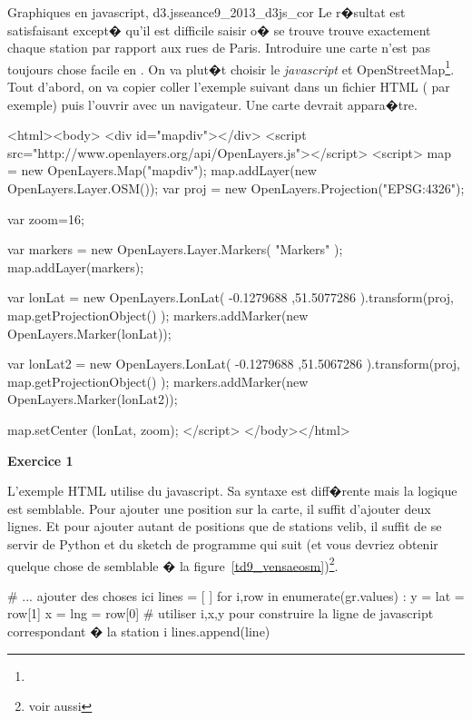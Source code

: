 \begin{xtd}{Graphiques en javascript, d3.js}{seance9_2013_d3js_cor}
Le r�sultat est satisfaisant except� qu'il est difficile saisir o� se trouve trouve exactement chaque station par rapport aux rues de Paris. Introduire une carte n'est pas toujours chose facile en \python. On va plut�t choisir le \textit{javascript} et OpenStreetMap\footnote{}. Tout d'abord, on va copier coller l'exemple suivant dans un fichier HTML ( par exemple) puis l'ouvrir avec un navigateur. Une carte devrait appara�tre.


\begin{verbatimx}
<html><body>
  <div id="mapdiv"></div>
  <script src="http://www.openlayers.org/api/OpenLayers.js"></script>
  <script>
    map = new OpenLayers.Map("mapdiv");
    map.addLayer(new OpenLayers.Layer.OSM());
    var proj =  new OpenLayers.Projection("EPSG:4326");
 
    var zoom=16;
 
    var markers = new OpenLayers.Layer.Markers( "Markers" );
    map.addLayer(markers);
 
    var lonLat = new OpenLayers.LonLat( -0.1279688 ,51.5077286 ).transform(proj, map.getProjectionObject() );
    markers.addMarker(new OpenLayers.Marker(lonLat));

    var lonLat2 = new OpenLayers.LonLat( -0.1279688 ,51.5067286 ).transform(proj, map.getProjectionObject() );
    markers.addMarker(new OpenLayers.Marker(lonLat2));
 
    map.setCenter (lonLat, zoom);
  </script>
</body></html>
\end{verbatimx}

\textbf{Exercice 1}

L'exemple HTML utilise du javascript. Sa syntaxe est diff�rente mais la logique est semblable. Pour ajouter une position sur la carte, il suffit d'ajouter deux lignes. Et pour ajouter autant de positions que de stations velib, il suffit de se servir de Python et du sketch de programme qui suit (et vous devriez obtenir quelque chose de semblable � la figure~\ref{td9_vensaeosm})\footnote{voir aussi }.


\begin{verbatimx}
# ... ajouter des choses ici
lines = [ ]
for i,row in enumerate(gr.values) :
    y = lat = row[1]
    x = lng = row[0]
    # utiliser i,x,y pour construire la ligne de javascript correspondant � la station i
    lines.append(line)
    

\end{verbatimx}
\end{xtd}
